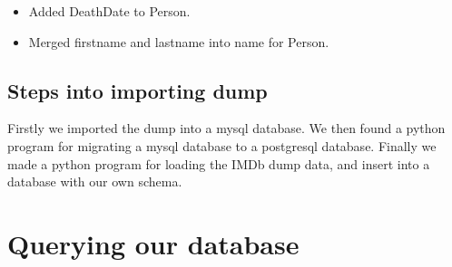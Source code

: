 \begin{itemize}
\item Added DeathDate to Person.
\item Merged firstname and lastname into name for Person.
\end{itemize}

\subsection{Steps into importing dump}
Firstly we imported the dump into a mysql database.
We then found a python program for migrating a mysql database to a postgresql database.
Finally we made a python program for loading the IMDb dump data, and insert into a database with our own schema.

\section{Querying our database}


